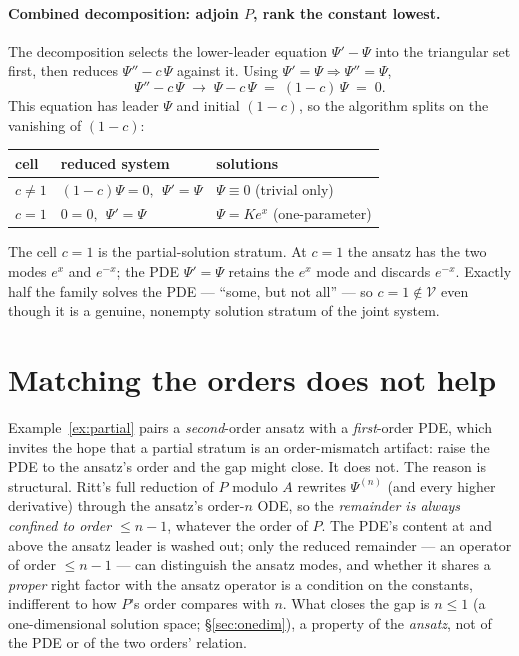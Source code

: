 \documentclass[11pt]{article}
\newcommand{\Psib}{\Psi}
\newcommand{\Var}{\mathcal{V}}
\begin{document}
\paragraph{Combined decomposition: adjoin $P$, rank the constant lowest.}
The decomposition selects the lower-leader equation $\Psib' - \Psib$ into the
triangular set first, then reduces $\Psib'' - c\,\Psib$ against it. Using
$\Psib' = \Psib \Rightarrow \Psib'' = \Psib$,
%
\[
\Psib'' - c\,\Psib \;\longrightarrow\; \Psib - c\,\Psib \;=\; (1-c)\,\Psib \;=\; 0 .
\]
%
This equation has leader $\Psib$ and initial $(1-c)$, so the algorithm splits
on the vanishing of $(1-c)$:
%
\begin{center}
\begin{tabular}{lll}
\toprule
cell & reduced system & solutions \\
\midrule
$c \ne 1$ & $(1-c)\Psib = 0,\ \ \Psib' = \Psib$ & $\Psib \equiv 0$ (trivial only)\\
$c = 1$   & $0 = 0,\ \ \Psib' = \Psib$           & $\Psib = K e^{x}$ (one-parameter)\\
\bottomrule
\end{tabular}
\end{center}

\noindent
The cell $c = 1$ is the partial-solution stratum. At $c = 1$ the ansatz has
the two modes $e^{x}$ and $e^{-x}$; the PDE $\Psib' = \Psib$ retains the
$e^{x}$ mode and discards $e^{-x}$. Exactly half the family solves the PDE ---
``some, but not all'' --- so $c = 1 \notin \Var$ even though it is a genuine,
nonempty solution stratum of the joint system.

\section{Matching the orders does not help}
\label{sec:orders}

Example~\ref{ex:partial} pairs a \emph{second}-order ansatz with a
\emph{first}-order PDE, which invites the hope that a partial stratum is an
order-mismatch artifact: raise the PDE to the ansatz's order and the gap might
close. It does not. The reason is structural. Ritt's full reduction of $P$
modulo $A$ rewrites $\Psib^{(n)}$ (and every higher derivative) through the
ansatz's order-$n$ ODE, so the \emph{remainder is always confined to order
$\le n-1$}, whatever the order of $P$. The PDE's content at and above the
ansatz leader is washed out; only the reduced remainder --- an operator of
order $\le n-1$ --- can distinguish the ansatz modes, and whether it shares a
\emph{proper} right factor with the ansatz operator is a condition on the
constants, indifferent to how $P$'s order compares with $n$. What closes the
gap is $n \le 1$ (a one-dimensional solution space; \S\ref{sec:onedim}),
a property of the \emph{ansatz}, not of the PDE or of the two orders' relation.
\end{document}
